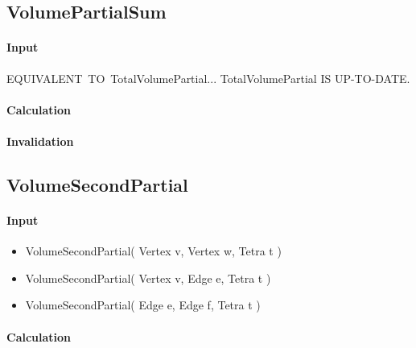 \bigskip

\subsection{VolumePartialSum}

\paragraph{Input}

EQUIVALENT\ TO\ TotalVolumePartial... TotalVolumePartial IS UP-TO-DATE.

\paragraph{Calculation}

\paragraph{Invalidation}

\bigskip

\subsection{VolumeSecondPartial}

\paragraph{Input}

\begin{itemize}
\item VolumeSecondPartial( Vertex v, Vertex w, Tetra t )

\item VolumeSecondPartial( Vertex v, Edge e, Tetra t )

\item VolumeSecondPartial( Edge e, Edge f, Tetra t )
\end{itemize}

\paragraph{Calculation}

